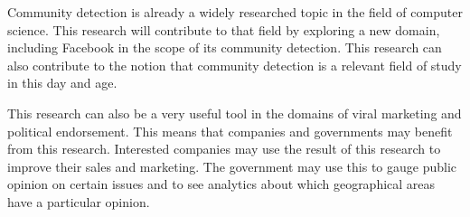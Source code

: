 Community detection is already a widely researched topic in the field of computer science. This research will contribute to that field by exploring a new domain, including Facebook in the scope of its community detection. This research can also contribute to the notion that community detection is a relevant field of study in this day and age.

This research can also be a very useful tool in the domains of viral marketing and political endorsement. This means that companies and governments may benefit from this research. Interested companies may use the result of this research to improve their sales and marketing. The government may use this to gauge public opinion on certain issues and to see analytics about which geographical areas have a particular opinion. 




